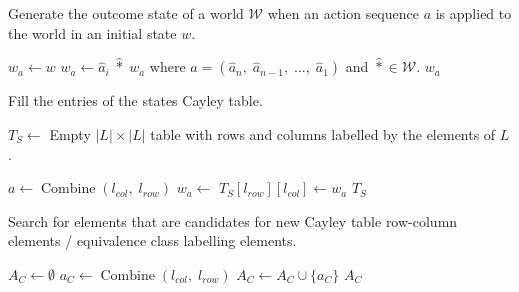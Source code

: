 \begin{algorithm}[H]
\caption{
Generate the outcome state of a world $\mathscr{W}$ when an action sequence $a$ is applied to the world in an initial state $w$.
}
\label{alg:GenerateActionOutcome2}
\hrulefill
\begin{algorithmic}[1]
    \State $w_{a} \gets w$
        \State $w_{a} \gets \hat{a}_{i} \; \hat{\ast} \; w_{a}$ where $a = (\hat{a}_n, \; \hat{a}_{n-1}, \; \dots, \; \hat{a}_1)$ and $\hat{\ast} \in \mathscr{W}$.
    \EndFor
    \State \Return $w_{a}$
\EndProcedure
\end{algorithmic}
\end{algorithm}


\begin{algorithm}[H]
\caption{
Fill the entries of the states Cayley table.
}
\hrulefill
\begin{algorithmic}[1]
    \State $T_{S} \gets$ Empty $|L| \times |L|$ table with rows and columns labelled by the elements of $L$.

        \State $a \gets \operatorname{Combine}(l_{col}, \; l_{row})$
        \State $w_{a} \gets$ 
        \State $T_{S}[l_{row}][l_{col}] \gets w_{a}$
    \EndFor
    \EndFor
    \State \Return $T_{S}$
\EndProcedure
\end{algorithmic}
\end{algorithm}


\begin{algorithm}[H]
\caption{Search for elements that are candidates for new Cayley table row-column elements / equivalence class labelling elements.}
\hrulefill
\begin{algorithmic}[1]
    \State $A_{C} \gets \emptyset$
        \State $a_{C} \gets \operatorname{Combine}(l_{col}, \; l_{row})$
        \Statex {}
            \State $A_{C} \gets A_{C} \cup \{a_{C}\}$
        \EndIf
    \EndFor
    \EndFor
    \State \Return $A_{C}$
\EndProcedure
\end{algorithmic}
\end{algorithm}


